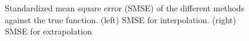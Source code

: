 \documentclass[]{interact}
\theoremstyle{plain}%
\theoremstyle{definition}
\theoremstyle{remark}
\begin{document}
\begin{figure}[H]
\centering
{}
\caption{Standardized mean square error (SMSE) of the different methods against the true function. (left) SMSE for interpolation. (right) SMSE for extrapolation}
  \label{fig11_MSE_exI_inter}
\end{figure}
\end{document}
